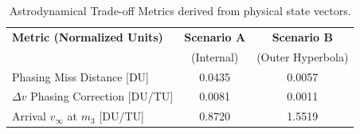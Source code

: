 \begin{table}[htpb]
\centering
\caption{Astrodynamical Trade-off Metrics derived from physical state vectors.}
\label{tab:results_metrics}
\begin{tabular}{lcc}
\toprule
\textbf{Metric (Normalized Units)} & \textbf{Scenario A} & \textbf{Scenario B} \\ 
 & (Internal) & (Outer Hyperbola) \\
\midrule
Phasing Miss Distance [DU] & 0.0435 & 0.0057 \\
$\Delta v$ Phasing Correction [DU/TU] & 0.0081 & 0.0011 \\
Arrival $v_\infty$ at $m_3$ [DU/TU] & 0.8720 & 1.5519 \\
\bottomrule
\end{tabular}
\end{table}